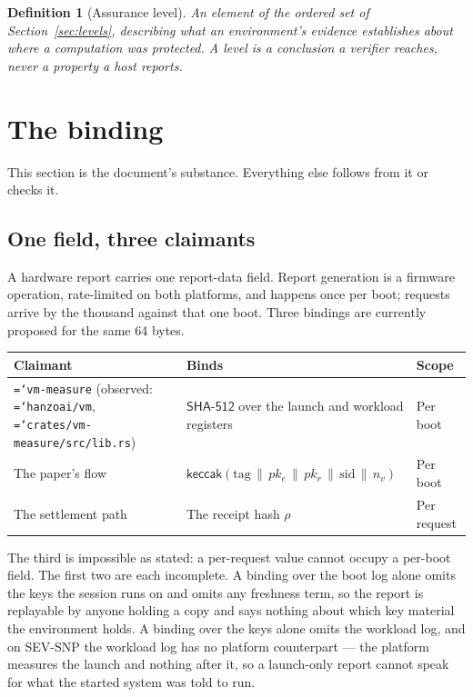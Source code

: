 \documentclass[11pt,a4paper]{article}
\newtheorem{definition}{Definition}[section]
\newcommand{\code}[1]{\texttt{\hyphenchar\font=`\-\relax #1}}
\begin{document}
\begin{definition}[Assurance level]
An element of the ordered set of Section~\ref{sec:levels}, describing what an
environment's evidence establishes about where a computation was protected. A
level is a conclusion a verifier reaches, never a property a host reports.
\end{definition}

\section{The binding}
\label{sec:binding}

This section is the document's substance. Everything else follows from it or
checks it.

\subsection{One field, three claimants}

A hardware report carries one report-data field. Report generation is a firmware
operation, rate-limited on both platforms, and happens once per boot; requests
arrive by the thousand against that one boot. Three bindings are currently
proposed for the same 64 bytes.

\begin{center}
\small
\begin{tabular}{@{}L{0.26\textwidth}L{0.40\textwidth}L{0.26\textwidth}@{}}
\toprule
Claimant & Binds & Scope \\
\midrule
\code{vm-measure} (observed: \code{hanzoai/vm}, \code{crates/vm-measure/src/lib.rs}) &
$\mathsf{SHA\text{-}512}$ over the launch and workload registers &
Per boot \\
The paper's flow \cite{paper} &
$\mathsf{keccak}(\text{tag} \,\|\, pk_e \,\|\, pk_r \,\|\, \mathrm{sid} \,\|\, n_v)$ &
Per boot \\
The settlement path \cite{paper} &
The receipt hash $\rho$ &
Per request \\
\bottomrule
\end{tabular}
\end{center}

The third is impossible as stated: a per-request value cannot occupy a per-boot
field. The first two are each incomplete. A binding over the boot log alone omits
the keys the session runs on and omits any freshness term, so the report is
replayable by anyone holding a copy and says nothing about which key material the
environment holds. A binding over the keys alone omits the workload log, and on
SEV-SNP the workload log has no platform counterpart --- the platform measures the
launch and nothing after it, so a launch-only report cannot speak for what the
started system was told to run.
\end{document}
